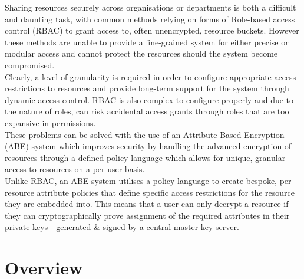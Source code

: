 Sharing resources securely across organisations or departments is both a difficult and daunting task, with common methods relying on forms of Role-based access control (RBAC) to grant access to, often unencrypted, resource buckets. However these methods are unable to provide a fine-grained system for either precise or modular access and cannot protect the resources should the system become compromised.\\
Clearly, a level of granularity is required in order to configure appropriate access restrictions to resources and provide long-term support for the system through dynamic access control. RBAC is also complex to configure properly and due to the nature of roles, can risk accidental access grants through roles that are too expansive in permissions.\\
These problems can be solved with the use of an Attribute-Based Encryption (ABE) system which improves security by handling the advanced encryption of resources through a defined policy language which allows for unique, granular access to resources on a per-user basis.\\
Unlike RBAC, an ABE system utilises a policy language to create bespoke, per-resource attribute policies that define specific access restrictions for the resource they are embedded into. This means that a user can only decrypt a resource if they can cryptographically prove assignment of the required attributes in their private keys - generated \& signed by a central master key server.

\section{Overview}

